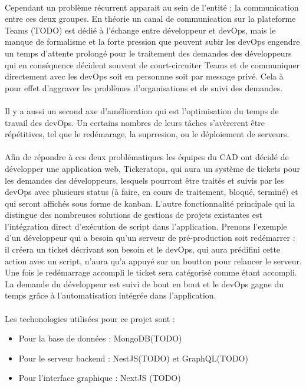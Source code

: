 \documentclass[12pt]{article}
\begin{document}
\begin {sloppypar}
\paragraph{}
Cependant un problème récurrent apparait au sein de l'entité : la communication entre ces deux 
groupes. En théorie un canal de communication sur la plateforme Teams (TODO) est dédié à l'échange 
entre développeur et devOps, mais le manque de formalisme et la forte pression que peuvent 
subir les devOps engendre un temps d'attente prolongé pour le traitement des demandes des développeurs
qui en conséquence décident souvent de court-circuiter Teams et de communiquer directement
avec les devOps soit en personnne soit par message privé. Cela à pour effet d'aggraver les problèmes
d'organisations et de suivi des demandes. 
\paragraph{}
Il y a aussi un second axe d'amélioration qui est l'optimisation du temps de travail des devOps. 
Un certains nombres de leurs tâches s'avèrerent être répétitives, tel que le redémarage, la suprresion,
ou le déploiement de serveurs. 
\paragraph{}
Afin de répondre à ces deux problématiques les équipes du CAD ont décidé de développer une application web,
Tickeratops, qui aura un système de tickets pour les demandes des développeurs, lesquels pourront être
traités et suivis par les devOps avec plusieurs status (à faire, en cours de traitement, bloqué, terminé)
et qui seront affichés sous forme de kanban. L'autre fonctionnalité principale qui la distingue des 
nombreuses solutions de gestions de projets existantes est l'intégration direct d'exécution de script dans
l'application. Prenons l'exemple d'un développeur qui a besoin qu'un serveur de pré-production soit redémarrer : 
il créera un ticket décrivant son besoin et le devOps, qui aura prédifini cette action avec un script, n'aura qu'a 
appuyé sur un boutton pour relancer le serveur. Une fois le redémarrage accompli le ticket sera catégorisé 
comme étant accompli. La demande du développeur est suivi de bout en bout et le devOps gagne du temps 
grâce à l'automatisation intégrée dans l'application.

\newpage
\paragraph{}
Les techonologies utilisées pour ce projet sont : 
\begin{itemize}
  \item 
    Pour la base de données : MongoDB(TODO)
  \item 
    Pour le serveur backend : NestJS(TODO) et GraphQL(TODO)
  \item 
    Pour l'interface graphique : NextJS (TODO)
\end{itemize}


\end{sloppypar}
\end{document}
